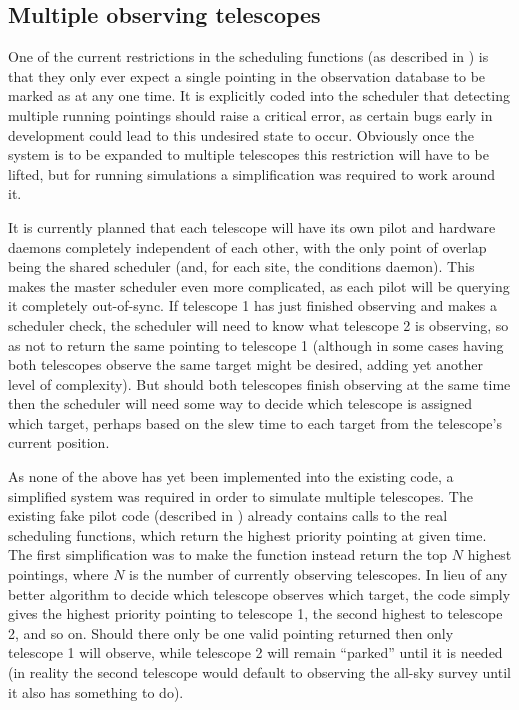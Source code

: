\subsection{Multiple observing telescopes}
\label{sec:multi_tel_scheduling}
\begin{colsection}

One of the current restrictions in the scheduling functions (as described in ) is that they only ever expect a single pointing in the observation database to be marked as  at any one time. It is explicitly coded into the scheduler that detecting multiple running pointings should raise a critical error, as certain bugs early in development could lead to this undesired state to occur. Obviously once the system is to be expanded to multiple telescopes this restriction will have to be lifted, but for running simulations a simplification was required to work around it.

It is currently planned that each telescope will have its own pilot and hardware daemons completely independent of each other, with the only point of overlap being the shared scheduler (and, for each site, the conditions daemon). This makes the master scheduler even more complicated, as each pilot will be querying it completely out-of-sync. If telescope 1 has just finished observing and makes a scheduler check, the scheduler will need to know what telescope 2 is observing, so as not to return the same pointing to telescope 1 (although in some cases having both telescopes observe the same target might be desired, adding yet another level of complexity). But should both telescopes finish observing at the same time then the scheduler will need some way to decide which telescope is assigned which target, perhaps based on the slew time to each target from the telescope's current position.

As none of the above has yet been implemented into the existing code, a simplified system was required in order to simulate multiple telescopes. The existing fake pilot code (described in ) already contains calls to the real scheduling functions, which return the highest priority pointing at given time. The first simplification was to make the function instead return the top $N$ highest pointings, where $N$ is the number of currently observing telescopes. In lieu of any better algorithm to decide which telescope observes which target, the code simply gives the highest priority pointing to telescope 1, the second highest to telescope 2, and so on. Should there only be one valid pointing returned then only telescope 1 will observe, while telescope 2 will remain ``parked'' until it is needed (in reality the second telescope would default to observing the all-sky survey until it also has something to do).


\end{colsection}

